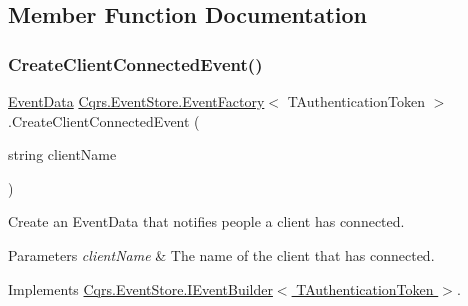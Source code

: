 \subsection{Member Function Documentation}
\mbox{\label{classCqrs_1_1EventStore_1_1EventFactory_a237daf998b545d170ab9f30187a0b8e7_a237daf998b545d170ab9f30187a0b8e7}} 
\subsubsection{\texorpdfstring{Create\+Client\+Connected\+Event()}{CreateClientConnectedEvent()}}
{\footnotesize\ttfamily \hyperlink{classCqrs_1_1Events_1_1EventData}{Event\+Data} \hyperlink{classCqrs_1_1EventStore_1_1EventFactory}{Cqrs.\+Event\+Store.\+Event\+Factory}$<$ T\+Authentication\+Token $>$.Create\+Client\+Connected\+Event (\begin{DoxyParamCaption}\item[{string}]{client\+Name }\end{DoxyParamCaption})}



Create an Event\+Data that notifies people a client has connected. 


\begin{DoxyParams}{Parameters}
{\em client\+Name} & The name of the client that has connected.\\
\hline
\end{DoxyParams}


Implements \hyperlink{interfaceCqrs_1_1EventStore_1_1IEventBuilder_ae11ead7fa69632041e081e60f51c4e9f_ae11ead7fa69632041e081e60f51c4e9f}{Cqrs.\+Event\+Store.\+I\+Event\+Builder$<$ T\+Authentication\+Token $>$}.

\mbox{\label{classCqrs_1_1EventStore_1_1EventFactory_a91394437675f3185d2105c6a79f7b5aa_a91394437675f3185d2105c6a79f7b5aa}} 
